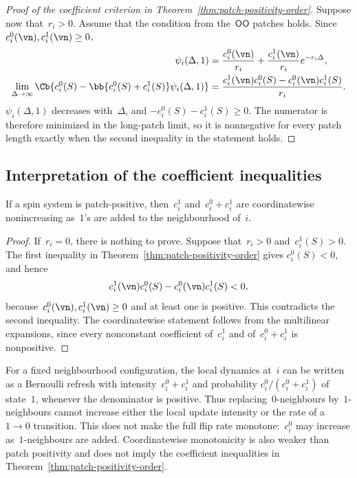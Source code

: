 \begin{proof}[Proof of the coefficient criterion in
Theorem~\ref{thm:patch-positivity-order}]
Suppose now that~$r_i>0$. Assume that the condition from the~$\mathsf{OO}$
patches holds. Since~$c_i^0(\vn),c_i^1(\vn)\geq0$,
\begin{align*}
\psi_i(\Delta,1)
&=
\frac{c_i^0(\vn)}{r_i}
+
\frac{c_i^1(\vn)}{r_i}e^{-r_i\Delta},
\\
\lim_{\Delta\to\infty}
\Cb{
 c_i^0(S)-\bb{c_i^0(S)+c_i^1(S)}\psi_i(\Delta,1)
}
&=
\frac{c_i^1(\vn)c_i^0(S)-c_i^0(\vn)c_i^1(S)}{r_i}.
\end{align*}
$\psi_i(\Delta,1)$ decreases with~$\Delta$, and
$-c_i^0(S)-c_i^1(S)\geq0$. The numerator is therefore minimized in the
long-patch limit, so it is nonnegative for every patch length exactly when the
second inequality in the statement holds.
\end{proof}

\subsection{Interpretation of the coefficient inequalities}
\label{subsec:positivity-interpretation}

\begin{corollary}
\label{cor:local-rate-monotonicity}
If a spin system is patch-positive, then~$c_i^1$ and~$c_i^0+c_i^1$ are
coordinatewise nonincreasing as~$1$'s are added to the neighbourhood of~$i$.
\end{corollary}

\begin{proof}
If~$r_i=0$, there is nothing to prove. Suppose that~$r_i>0$ and~$c_i^1(S)>0$.
The first inequality in Theorem~\ref{thm:patch-positivity-order} gives
$c_i^0(S)<0$, and hence
\begin{equation*}
c_i^1(\vn)c_i^0(S)-c_i^0(\vn)c_i^1(S)<0,
\end{equation*}
because~$c_i^0(\vn),c_i^1(\vn)\geq0$ and at least one is positive. This
contradicts the second inequality. The coordinatewise statement follows from
the multilinear expansions, since every nonconstant coefficient of~$c_i^1$
and of~$c_i^0+c_i^1$ is nonpositive.
\end{proof}

For a fixed neighbourhood configuration, the local dynamics at~$i$ can be
written as a Bernoulli refresh with intensity~$c_i^0+c_i^1$ and probability
$c_i^0/(c_i^0+c_i^1)$ of state~$1$, whenever the denominator is positive.
Thus replacing~$0$-neighbours by~$1$-neighbours cannot increase either the
local update intensity or the rate of a~$1\to0$ transition. This does not make
the full flip rate monotone:~$c_i^0$ may increase as~$1$-neighbours are added.
Coordinatewise monotonicity is also weaker than patch positivity and does not
imply the coefficient inequalities in
Theorem~\ref{thm:patch-positivity-order}.

